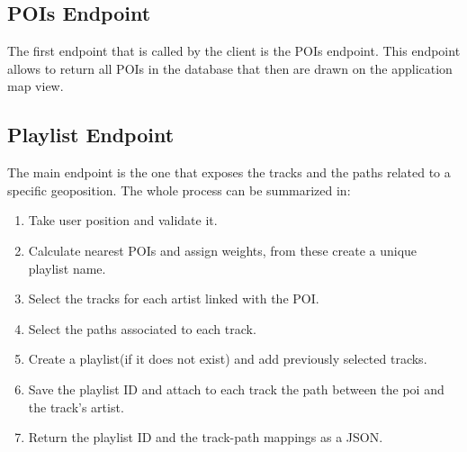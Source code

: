 \documentclass[paper=a4, fontsize=11pt]{scrartcl}
\begin{document}
\subsection{POIs Endpoint}
The first endpoint that is called by the client is the POIs endpoint.
This endpoint allows to return all POIs in the database that then are drawn on the application map view.
\subsection{Playlist Endpoint}
The main endpoint is the one that exposes the tracks and the paths related to a specific geoposition.
The whole process can be summarized in:
\begin{enumerate}
\item Take user position and validate it.
\item Calculate nearest POIs and assign weights, from these create a unique playlist name.
\item Select the tracks for each artist linked with the POI.
\item Select the paths associated to each track.
\item Create a playlist(if it does not exist) and add previously selected tracks.
\item Save the playlist ID and attach to each track the path between the poi and the track's artist.
\item Return the playlist ID and the track-path mappings as a JSON.
\end{enumerate}

\newcommand*\circled[1]{\tikz[baseline=(char.base)]{
    \node[shape=circle,draw,inner sep=2pt] (char) {#1};}}
\end{document}
